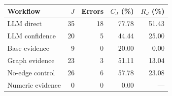 \begin{tabular*}{\linewidth}{@{\extracolsep{\fill}}lrrrr@{}}
\toprule
Workflow & $J$ & Errors & $C_J$ (\%) & $R_J$ (\%) \\
\midrule
LLM direct & 35 & 18 & 77.78 & 51.43 \\
LLM confidence & 20 & 5 & 44.44 & 25.00 \\
Base evidence & 9 & 0 & 20.00 & 0.00 \\
Graph evidence & 23 & 3 & 51.11 & 13.04 \\
No-edge control & 26 & 6 & 57.78 & 23.08 \\
Numeric evidence & 0 & 0 & 0.00 & --- \\
\bottomrule
\end{tabular*}
